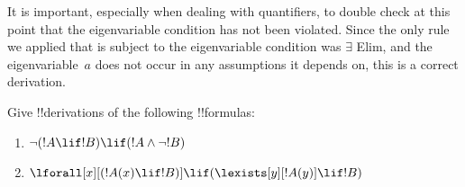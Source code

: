 \documentclass[../../include/open-logic-section]{subfiles}
\begin{document}
\begin{ex}
It is important, especially when dealing with quantifiers, to double
check at this point that the eigenvariable condition has not been
violated. Since the only rule we applied that is subject to the
eigenvariable condition was $\exists$ Elim, and the eigenvariable~$a$
does not occur in any assumptions it depends on, this is a
correct derivation.
\end{ex}

\begin{prob}
Give !!{derivation}s of the following !!{formula}s:
\begin{enumerate}
\item $\lnot(!A \lif !B) \lif (!A \land \lnot !B)$
\item $\lforall[x][(!A(x) \lif !B)] \lif (\lexists[y][!A(y)] \lif !B)$
\end{enumerate}
\end{prob}
\end{document}
